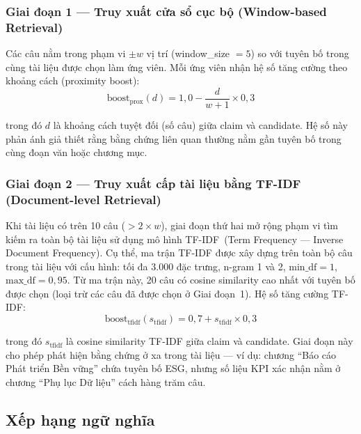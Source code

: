 \subsubsection{Giai đoạn 1 --- Truy xuất cửa sổ cục bộ (Window-based Retrieval)}

Các câu nằm trong phạm vi $\pm w$ vị trí (window\_size $= 5$) so với tuyên bố trong cùng tài liệu được chọn làm ứng viên. Mỗi ứng viên nhận hệ số tăng cường theo khoảng cách (proximity boost):
\begin{equation}
    \text{boost}_{\text{prox}}(d) = 1{,}0 - \frac{d}{w + 1} \times 0{,}3
    \label{eq:proximity_boost}
\end{equation}

\noindent trong đó $d$ là khoảng cách tuyệt đối (số câu) giữa claim và candidate. Hệ số này phản ánh giả thiết rằng bằng chứng liên quan thường nằm gần tuyên bố trong cùng đoạn văn hoặc chương mục.


\subsubsection{Giai đoạn 2 --- Truy xuất cấp tài liệu bằng TF-IDF (Document-level Retrieval)}

Khi tài liệu có trên 10 câu ($> 2 \times w$), giai đoạn thứ hai mở rộng phạm vi tìm kiếm ra toàn bộ tài liệu sử dụng mô hình TF-IDF~(Term Frequency --- Inverse Document Frequency). Cụ thể, ma trận TF-IDF được xây dựng trên toàn bộ câu trong tài liệu với cấu hình: tối đa 3.000 đặc trưng, n-gram 1 và 2, $\text{min\_df} = 1$, $\text{max\_df} = 0{,}95$. Từ ma trận này, 20 câu có cosine similarity cao nhất với tuyên bố được chọn (loại trừ các câu đã được chọn ở Giai đoạn~1). Hệ số tăng cường TF-IDF:
\begin{equation}
    \text{boost}_{\text{tfidf}}(s_{\text{tfidf}}) = 0{,}7 + s_{\text{tfidf}} \times 0{,}3
    \label{eq:tfidf_boost}
\end{equation}

\noindent trong đó $s_{\text{tfidf}}$ là cosine similarity TF-IDF giữa claim và candidate. Giai đoạn này cho phép phát hiện bằng chứng ở xa trong tài liệu --- ví dụ: chương ``Báo cáo Phát triển Bền vững'' chứa tuyên bố ESG, nhưng số liệu KPI xác nhận nằm ở chương ``Phụ lục Dữ liệu'' cách hàng trăm câu.


\subsection{Xếp hạng ngữ nghĩa}
\label{subsec:semantic_ranking}

